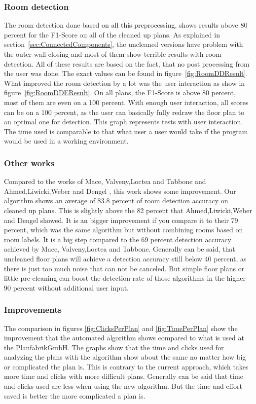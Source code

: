 \subsubsection{Room detection}
The room detection done based on all this preprocessing, shows results above 80 percent for the F1-Score on all of the cleaned up plans. As explained in section~\ref{sec:ConnectedComponents}, the uncleaned versions have problem with the outer wall closing and most of them show terrible results with room detection. All of these results are based on the fact, that no post processing from the user was done. The exact values can be found in figure~\ref{fig:RoomDDResult}. What improved the room detection by a lot was the user interaction as show in figure~\ref{fig:RoomDDEResult}. On all plans, the F1-Score is above 80 percent, most of them are even on a 100 percent. With enough user interaction, all scores can be on a 100 percent, as the user can basically fully redraw the floor plan to an optimal one for detection. This graph represents tests with user interaction. The time used is comparable to that what user a user would take if the program would be used in a working environment.

\subsubsection{Other works}
Compared to the works of Mace, Valveny,Loctea and Tabbone \citep{mace_valveny_loctea_tabbone_2010} and Ahmed,Liwicki,Weber and Dengel \citep{ahmed_liwicki_weber_dengel_2012}, this work shows some improvement. Our algorithm shows an average of 83.8 percent of room detection accuracy on cleaned up plans. This is slightly above the 82 percent that Ahmed,Liwicki,Weber and Dengel showed. It is an bigger improvement if you compare it to their 79 percent, which was the same algorithm but without combining rooms based on room labels. It is a big step compared to the 69 percent detection accuracy achieved by Mace, Valveny,Loctea and Tabbone. Generally can be said, that uncleaned floor plans will achieve a detection accuracy still below 40 percent, as there is just too much noise that can not be canceled. But simple floor plans or little pre-cleaning can boost the detection rate of those algorithms in the higher 90 percent without additional user input. 

\subsubsection{Improvements}
The comparison in figures \ref{fig:ClicksPerPlan} and \ref{fig:TimePerPlan} show the improvement that the automated algorithm shows compared to what is used at the PlanfabrikGmbH. The graphs show that the time and clicks used for analyzing the plans with the algorithm show about the same no matter how big or complicated the plan is. This is contrary to the current approach, which takes more time and clicks with more difficult plans. Generally can be said that time and clicks used are less when using the new algorithm. But the time and effort saved is better the more complicated a plan is. 

